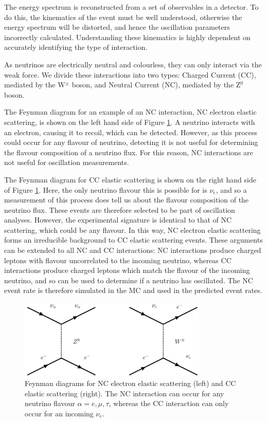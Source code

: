 The energy spectrum is reconstructed from a set of observables in a detector. To do this, the kinematics of the event must be well understood, otherwise the  energy spectrum will be distorted, and hence the oscillation parameters incorrectly calculated. Understanding these kinematics is highly dependent on accurately identifying the type of interaction. 

As neutrinos are electrically neutral and colourless, they can only interact via the weak force. We divide these interactions into two types: Charged Current (CC), mediated by the W$^\pm$ boson, and Neutral Current (NC), mediated by the Z$^0$ boson.

The Feynman diagram for an example of an NC interaction, NC electron elastic scattering, is shown on the left hand side of Figure \ref{Scattdiagram}. A neutrino interacts with an electron, causing it to recoil, which can be detected. However, as this process could occur for any flavour of neutrino, detecting it is not useful for determining the flavour composition of a neutrino flux. For this reason, NC interactions are not useful for oscillation measurements.

The Feynman diagram for CC elastic scattering is shown on the right hand side of Figure \ref{Scattdiagram}. Here, the only neutrino flavour this is possible for is $\nu_e$, and so a measurement of this process does tell us about the flavour composition of the neutrino flux. These events are therefore selected to be part of oscillation analyses. However, the experimental signature is identical to that of NC scattering, which could be any flavour. In this way, NC electron elastic scattering forms an irreducible background to CC elastic scattering events. These arguments can be extended to all NC and CC interactions: NC interactions produce charged leptons with flavour uncorrelated to the incoming neutrino, whereas CC interactions produce charged leptons which match the flavour of the incoming neutrino, and so can be used to determine if a neutrino has oscillated. The NC event rate is therefore simulated in the MC and used in the predicted event rates. 

\begin{figure}[!htbp]
\vspace{20pt}
\centering
\includegraphics*[width=0.8\textwidth,clip]{figs/feynmanScatt}
\caption{Feynman diagrams for NC electron elastic scattering (left) and CC elastic scattering (right). The NC interaction can occur for any neutrino flavour $\alpha = e, \mu, \tau$, whereas the CC interaction can only occur for an incoming $\nu_{e}$.} \label{Scattdiagram}
\end{figure}

